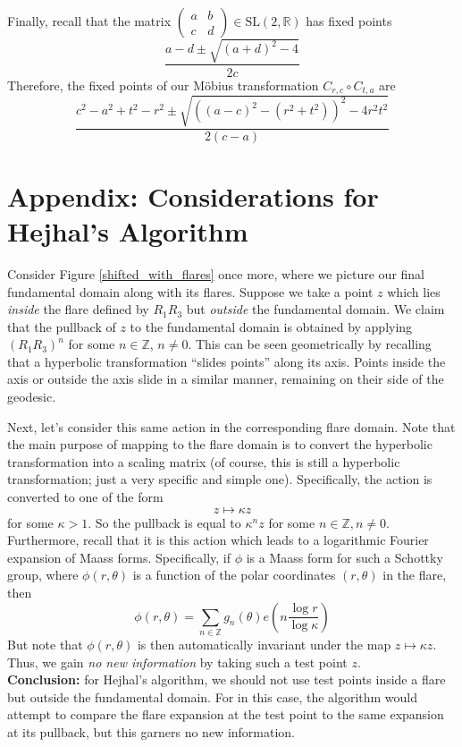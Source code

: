 \documentclass[]{article}
\begin{document}
Finally, recall that the matrix $
\left(
\begin{smallmatrix}
a & b \\
c & d
\end{smallmatrix}
\right) \in \text{SL}(2, \mathbb{R})$ has fixed points
$$
\frac{a - d \pm \sqrt{(a + d)^2 - 4}}{2c}
$$
Therefore, the fixed points of our M\"obius transformation $C_{r, c}\circ C_{t, a}$ are
$$
\frac{c^2 - a^2 + t^2 - r^2 \pm \sqrt{( (a - c)^2 - (r^2 + t^2) )^2 - 4r^2t^2}}{2(c - a)}
$$

\section*{Appendix: Considerations for Hejhal's Algorithm}

Consider Figure \ref{shifted_with_flares} once more, where we picture our final fundamental domain along with its flares.
Suppose we take a point $z$ which lies \textit{inside} the flare defined by $R_1R_3$ but \textit{outside} the fundamental domain.
We claim that the pullback of $z$ to the fundamental domain is obtained by applying $(R_1R_3)^n$ for some $n \in \mathbb{Z}$, $n \neq 0$.
This can be seen geometrically by recalling that a hyperbolic transformation ``slides points'' along its axis.
Points inside the axis or outside the axis slide in a similar manner, remaining on their side of the geodesic.

Next, let's consider this same action in the corresponding flare domain.
Note that the main purpose of mapping to the flare domain is to convert the hyperbolic transformation into a scaling matrix (of course, this is still a hyperbolic transformation; just a very specific and simple one).
Specifically, the action is converted to one of the form
$$
z \mapsto \kappa z
$$
for some $\kappa > 1$.
So the pullback is equal to $\kappa^nz$ for some $n \in \mathbb{Z}, n \neq 0$.
Furthermore, recall that it is this action which leads to a logarithmic Fourier expansion of Maass forms.
Specifically, if $\phi$ is a Maass form for such a Schottky group, where $\phi(r, \theta)$ is a function of the polar coordinates $(r, \theta)$ in the flare, then
$$
\phi(r, \theta) = \sum_{n\in\mathbb{Z}}g_n(\theta)e\left( n\frac{\log r}{\log \kappa} \right)
$$
But note that $\phi(r, \theta)$ is then automatically invariant under the map $z \mapsto \kappa z$.
Thus, we gain \textit{no new information} by taking such a test point $z$.
\\

\textbf{Conclusion:} for Hejhal's algorithm, we should not use test points inside a flare but outside the fundamental domain.
For in this case, the algorithm would attempt to compare the flare expansion at the test point to the same expansion at its pullback, but this garners no new information.
\end{document}
